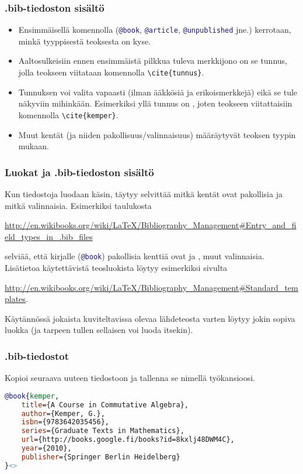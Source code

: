 \begin{fframe}
    \frametitle{.bib-tiedoston sisältö}
    \begin{itemize}[<+->]
        \item Ensimmäisellä komennolla (\lstinline[language=BibTeX]-@book-, \lstinline[language=BibTeX]-@article-, \lstinline[language=BibTeX]-@unpublished- jne.) kerrotaan, minkä tyyppisestä teoksesta on kyse. 
        \item Aaltosulkeisiin ennen ensimmäistä pilkkua tuleva merkkijono on se tunnus, jolla teokseen viitataan komennolla \lstinline-\cite{tunnus}-. 
        \item Tunnuksen voi valita vapaasti (ilman ääkkösiä ja erikoismerkkejä) eikä se tule näkyviin mihinkään.  Esimerkiksi yllä tunnus on , joten teokseen viitattaisiin komennolla \lstinline-\cite{kemper}-.
        \item Muut kentät (ja niiden pakollisuus/valinnaisuus) määräytyvät teoksen tyypin mukaan.
    \end{itemize}
\end{fframe}

\begin{fframe}
    \frametitle{Luokat ja .bib-tiedoston sisältö}
    Kun tiedostoja luodaan käsin, täytyy selvittää mitkä kentät ovat pakollisia ja mitkä valinnaisia. 
    \vaihto
    Esimerkiksi taulukosta 
    \begin{scriptsize}
        \url{http://en.wikibooks.org/wiki/LaTeX/Bibliography_Management#Entry_and_field_types_in_.bib_files}
    \end{scriptsize}
    selviää, että kirjalle (\lstinline[language=BibTeX]-@book-) pakollisia kenttiä ovat  ja , muut valinnaisia.
    \pause
    \vaihto
    Lisätietoa käytettävistä teosluokista löytyy esimerkiksi sivulta
    \begin{scriptsize}
        \url{http://en.wikibooks.org/wiki/LaTeX/Bibliography_Management#Standard_templates}.
    \end{scriptsize}
    \vaihto
    Käytännössä jokaista kuviteltavissa olevaa lähdeteosta varten löytyy jokin sopiva luokka (ja tarpeen tullen sellaisen voi luoda itsekin).
\end{fframe}

\begin{fframe}
    \frametitle{.bib-tiedostot}
    \begin{harj}
        Kopioi seuraava uuteen tiedostoon ja tallenna se nimellä  työkansioosi. 
        \begin{lstlisting}[language=BibTeX,basicstyle=\ttfamily\small]
@book{kemper,
    title={A Course in Commutative Algebra},
    author={Kemper, G.},
    isbn={9783642035456},
    series={Graduate Texts in Mathematics},
    url={http://books.google.fi/books?id=8kxlj48DWM4C},
    year={2010},
    publisher={Springer Berlin Heidelberg}
}<>
        \end{lstlisting}
    \end{harj}
\end{fframe}


